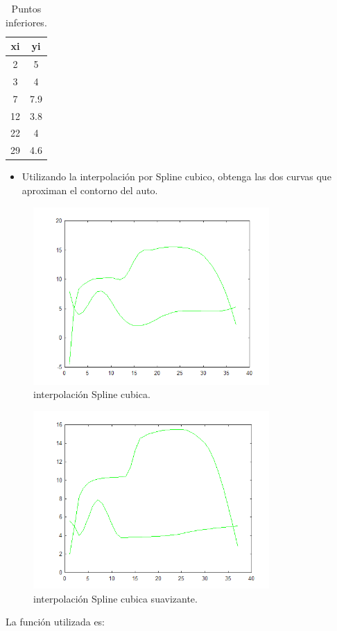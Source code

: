 \documentclass{udpreport}
\begin{document}
\begin{enumerate}
 \begin{table}[H]
    \centering
        \begin{tabular} { |c|c|}
        
        \hline
        xi  &  yi\\
        \hline
        2 &  5       \\
         \hline
        3 &  4        \\
         \hline
        7 &  7.9        \\
         \hline
        12 &  3.8        \\
         \hline
        22 &  4        \\
         \hline
        29 & 4.6        \\
        \hline
        \end{tabular}
        \caption{Puntos inferiores.}
    \end{table}
 \begin{itemize}
\item Utilizando la interpolación por Spline cubico, obtenga las dos curvas que aproximan el contorno del auto.
\end{itemize}

\begin{figure}[H]
    \centering
    \includegraphics[width=9cm]{interp_spline}
    \caption{interpolación Spline cubica.} \label{fig:interp_spline}
\end{figure}

\begin{figure}[H]
    \centering
    \includegraphics[width=9cm]{interp_spline_csaps}
    \caption{interpolación Spline cubica suavizante.} \label{fig:interp_spline_csaps}
\end{figure}
La función utilizada es:
 

\end{enumerate}
\end{document}

